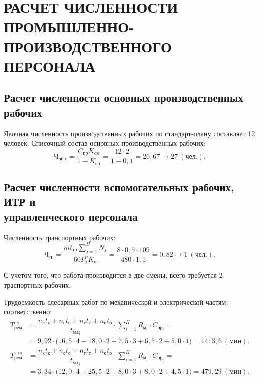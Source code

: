 \section[%
Расчет численности промышленно-производственного персонала]{%
РАСЧЕТ ЧИСЛЕННОСТИ \\
ПРОМЫШЛЕННО-ПРОИЗВОДСТВЕННОГО \\
ПЕРСОНАЛА
}
\label{sec:number}

\subsection[%
Расчет численности основных производственных рабочих
]{%
Расчет численности основных производственных рабочих
}

Явочная численность производственных рабочих по стандарт-плану
составляет 12 человек.
Списочный состав основных производственных рабочих:
\begin{equation*}
  \text{Ч}_{\text{оп.с}} = 
    \dfrac{C_{\text{пр}}K_{см}}{1-K_{\text{сп}}} =
    \dfrac{12 \cdot 2}{1-0{,}1} =
    26{,}67 \rightarrow 27 \: (\text{чел.}).
\end{equation*}

\subsection[%
Расчет численности вспомогательных рабочих, ИТР и \\
управленческого персонала
]{%
Расчет численности вспомогательных рабочих, ИТР и \\
управленческого персонала
}

Численность транспортных рабочих:
\begin{equation*}
  \text{Ч}_{\text{тр}} = 
  \dfrac{m t_{\text{тр}} \sum^H_{j=1} N_j}{60 F^p_{\text{э}} K_{\text{в}}} =
  \dfrac{8 \cdot 0{,}5 \cdot 109}{480 \cdot 1{,}1} =
  0{,}82 \rightarrow 1 \: (\text{чел.}).
\end{equation*}

С учетом того, что работа производится в две смены, 
всего требуется 2 траспортных рабочих.

Трудоемкость слесарных работ по механической и электрической частям соответственно:
{\small
\begin{align*}
  T^{\text{сл}}_{\text{рем}} &= 
  \dfrac{
    n_{\text{к}}t_{\text{к}} + n_{\text{с}}t_{\text{с}} +
    n_{\text{т}}t_{\text{т}} + n_{\text{о}}t_{\text{о}}
  }{
    t_{\text{м.ц}}
  } \cdot \sum^K_{i=1} R_{\text{м}_i} \cdot C_{\text{пр}_i} = \\
  &= 9{,}92
    \cdot
    \big(
      16{,}5 \cdot 4 + 18{,}0 \cdot 2 + 7{,}5 \cdot 3 + 
      6{,}5 \cdot 2 + 5{,}0 \cdot 1
    \big) =
    1413{,}6 \: (\text{мин}). 
  \\
  T^{\text{э.сл}}_{\text{рем}} &= 
  \dfrac{
    n_{\text{к}}t_{\text{к}} + n_{\text{с}}t_{\text{с}} +
    n_{\text{т}}t_{\text{т}} + n_{\text{о}}t_{\text{о}}
  }{
    t_{\text{м.ц}}
  } \cdot \sum^K_{i=1} R_{\text{м}_i} \cdot C_{\text{пр}_i} = \\
  &= 3{,}34
    \cdot
    \big(
      12{,}0 \cdot 4 + 25{,}5 \cdot 2 + 8{,}0 \cdot 3 + 
      8{,}0 \cdot 2 + 4{,}5 \cdot 1
    \big) =
    479{,}29 \: (\text{мин}).
\end{align*}
}

